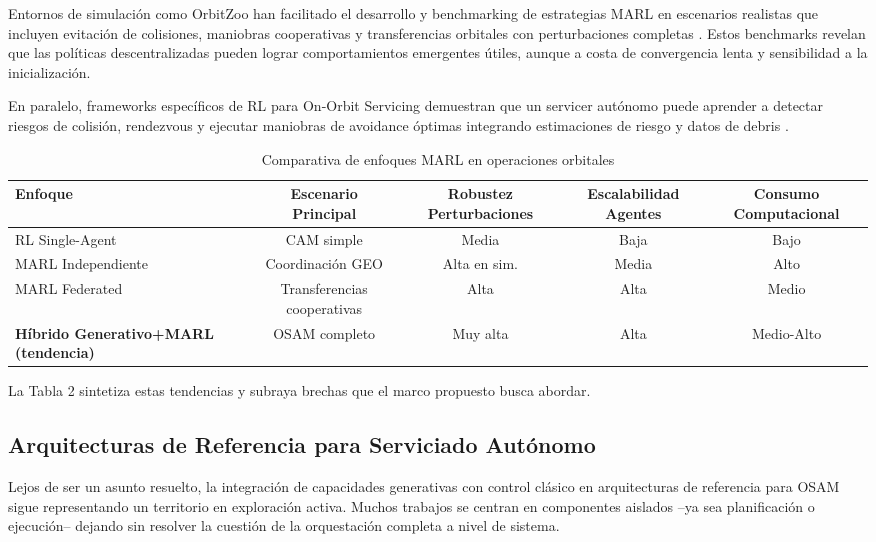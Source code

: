 Entornos de simulación como OrbitZoo han facilitado el desarrollo y benchmarking de estrategias MARL en escenarios realistas que incluyen evitación de colisiones, maniobras cooperativas y transferencias orbitales con perturbaciones completas \cite{Oliveira2025_OrbitZoo}. Estos benchmarks revelan que las políticas descentralizadas pueden lograr comportamientos emergentes útiles, aunque a costa de convergencia lenta y sensibilidad a la inicialización.

En paralelo, frameworks específicos de RL para On-Orbit Servicing demuestran que un servicer autónomo puede aprender a detectar riesgos de colisión, rendezvous y ejecutar maniobras de avoidance óptimas integrando estimaciones de riesgo y datos de debris \cite{Patnala2024_OOS_RL}. 

\begin{table}[t]
\centering
\caption{Comparativa de enfoques MARL en operaciones orbitales}
\label{tab:marl_comparison}
\begin{tabular}{lcccc}
\hline
Enfoque & Escenario Principal & Robustez Perturbaciones & Escalabilidad Agentes & Consumo Computacional \\
\hline
RL Single-Agent & CAM simple & Media & Baja & Bajo \\
MARL Independiente & Coordinación GEO & Alta en sim. & Media & Alto \\
MARL Federated & Transferencias cooperativas & Alta & Alta & Medio \\
\textbf{Híbrido Generativo+MARL (tendencia)} & OSAM completo & Muy alta & Alta & Medio-Alto \\
\hline
\end{tabular}
\end{table}

La Tabla 2 sintetiza estas tendencias y subraya brechas que el marco propuesto busca abordar.

\subsection{Arquitecturas de Referencia para Serviciado Autónomo}

Lejos de ser un asunto resuelto, la integración de capacidades generativas con control clásico en arquitecturas de referencia para OSAM sigue representando un territorio en exploración activa. Muchos trabajos se centran en componentes aislados --ya sea planificación o ejecución-- dejando sin resolver la cuestión de la orquestación completa a nivel de sistema.

